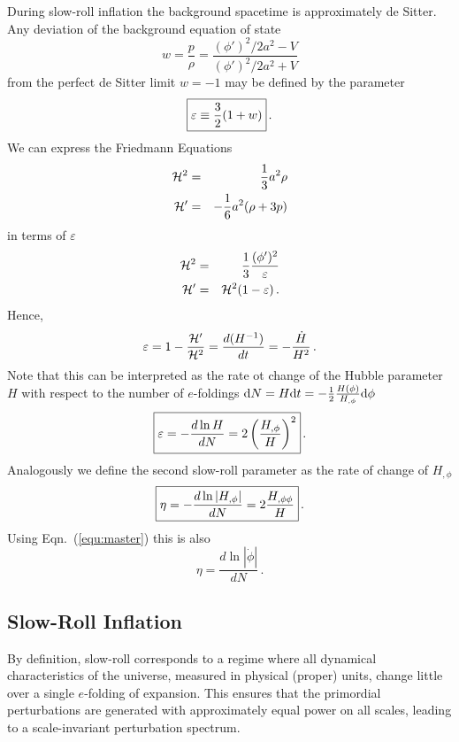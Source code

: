 \documentclass[12pt,letterpaper,rotate]{article}
\def\beq{\begin{equation}}
\def\eeq{\end{equation}}
\def\d{{\rm d}}
\begin{document}
{During slow-roll inflation the background spacetime is approximately de Sitter. Any deviation of the background equation of state 
\beq
w=\frac{p}{\rho} = \frac{(\phi')^2/2a^2 -V}{(\phi')^2/2a^2 + V}
\eeq
from the perfect de Sitter limit $w=-1$ may be defined by the parameter
\beq
\fbox{$\displaystyle
\varepsilon \equiv \frac{3}{2}(1+w) $}\, .
\eeq 
We can express the Friedmann Equations
\begin{eqnarray}
{\cal H}^2 &=& \frac{1}{3} a^2 \rho\\
{\cal H}' &=& -\frac{1}{6} a^2 (\rho+3p)
\end{eqnarray}
in terms of $\varepsilon$
\begin{eqnarray}
{\cal H}^2 &=& \frac{1}{3} \frac{(\phi')^2}{\varepsilon}\\
{\cal H}' &=& {\cal H}^2 (1-\varepsilon) \, .
\end{eqnarray}
Hence,
\beq
\varepsilon = 1-\frac{{\cal H}'}{{\cal H}^2} = \frac{d (H^{-1})}{d t} = - \frac{\dot H}{H^2}\, .
\eeq
Note that this can be interpreted as the rate ot change of the Hubble parameter $H$ with respect to the number of $e$-foldings $\d N = H \d t = -\frac{1}{2} \frac{H(\phi)}{H_{,\phi}} \d\phi$
\beq
\fbox{$\displaystyle
\varepsilon = -\frac{d \ln H}{d N} = 2 \left(\frac{H_{,\phi}}{H}\right)^2 $}\, .
\eeq
Analogously we define the second slow-roll parameter as the rate of change of $H_{,\phi}$
\beq
\fbox{$\displaystyle
\eta = - \frac{d \ln |H_{,\phi}|}{d N} = 2 \frac{H_{,\phi \phi}}{H}$}\, .
\eeq
Using Eqn.~(\ref{equ:master}) this is also
\beq
\eta = \frac{d \ln | \dot \phi |}{d N}\, .
\eeq

\subsection{Slow-Roll Inflation}

By definition, slow-roll corresponds to a regime where all dynamical characteristics of the universe, measured in physical (proper) units, change little over a single $e$-folding of expansion. This ensures that the primordial perturbations are generated with approximately equal power on all scales, leading to a scale-invariant perturbation spectrum.

}
\end{document}
